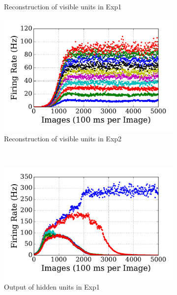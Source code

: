 \begin{figure}
\begin{subfigure}[t]{0.48\textwidth}
		\caption{Reconstruction of visible units in Exp1}
	\end{subfigure}
	\begin{subfigure}[t]{0.48\textwidth}
		\includegraphics[width=\textwidth]{pics_sdlm/15_exp_SRBM_teach_long/exp2_recon_s.pdf}
		\caption{Reconstruction of visible units in Exp2}
	\end{subfigure}\\
	\begin{subfigure}[t]{0.48\textwidth}
		\includegraphics[width=\textwidth]{pics_sdlm/15_exp_SRBM_teach_long/exp1_hid_s.pdf}
		\caption{Output of hidden units in Exp1}
	\end{subfigure}
	\begin{subfigure}[t]{0.48\textwidth}

\end{subfigure}
\end{figure}
